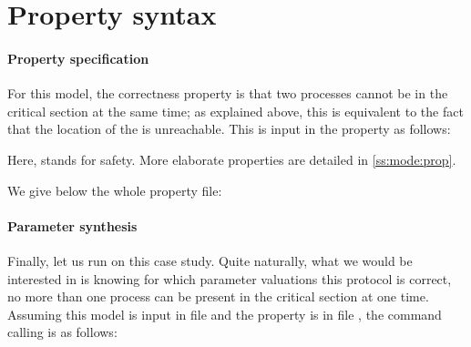 \section{Property syntax}

\paragraph{Property specification}
For this model, the correctness property is that two processes cannot be in the critical section at the same time; as explained above, this is equivalent to the fact that the  location of the  \IPTA{} is unreachable.
This is input in the property as follows:
\begin{center}
\end{center}
Here,  stands for safety.
More elaborate properties are detailed in \cref{ss:mode:prop}.

We give below the whole property file:




\paragraph{Parameter synthesis}
Finally, let us run \imitator{} on this case study.
Quite naturally, what we would be interested in is knowing for which parameter valuations this protocol is correct, \ie{} no more than one process can be present in the critical section at one time.
Assuming this model is input in file  and the property is in file , the command calling \imitator{} is as follows:



